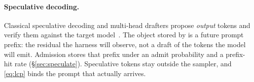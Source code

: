 \paragraph{Speculative decoding.}
Classical speculative decoding and multi-head drafters propose \emph{output} tokens and verify them against the target model~\cite{speculative,medusa,eagledraft}.
The object stored by \sys is a future prompt prefix: the residual the harness will observe, not a draft of the tokens the model will emit.
Admission stores that prefix under an admit probability and a prefix-hit rate (\S\ref{sec:speculate}).
Speculative tokens stay outside the sampler, and \eqref{eq:lcp} binds the prompt that actually arrives.
